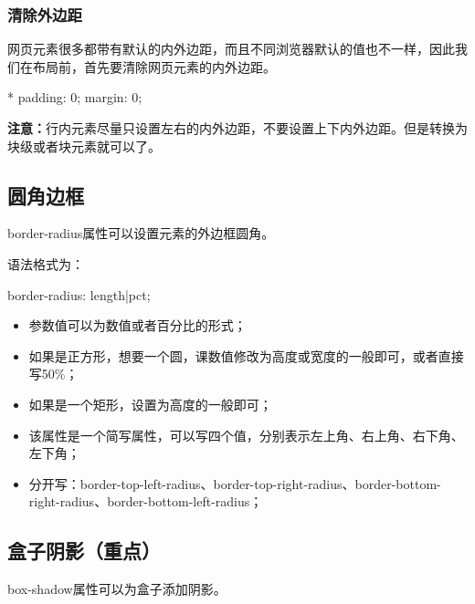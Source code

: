 \subsubsection{清除外边距}
网页元素很多都带有默认的内外边距，而且不同浏览器默认的值也不一样，因此我们在布局前，首先要清除网页元素的内外边距。

\begin{css}
    * {
        padding: 0;
        margin: 0;
    }
\end{css}

\textbf{注意：}行内元素尽量只设置左右的内外边距，不要设置上下内外边距。但是转换为块级或者块元素就可以了。
\subsection{圆角边框}
border-radius属性可以设置元素的外边框圆角。

语法格式为：
\begin{css}
    border-radius: length|pct;
\end{css}
\begin{itemize}
    \item 参数值可以为数值或者百分比的形式；
    \item 如果是正方形，想要一个圆，课数值修改为高度或宽度的一般即可，或者直接写50\%；
    \item 如果是一个矩形，设置为高度的一般即可；
    \item 该属性是一个简写属性，可以写四个值，分别表示左上角、右上角、右下角、左下角；
    \item 分开写：border-top-left-radius、border-top-right-radius、border-bottom-right-radius、border-bottom-left-radius；
\end{itemize}
\subsection{盒子阴影（重点）}
box-shadow属性可以为盒子添加阴影。

